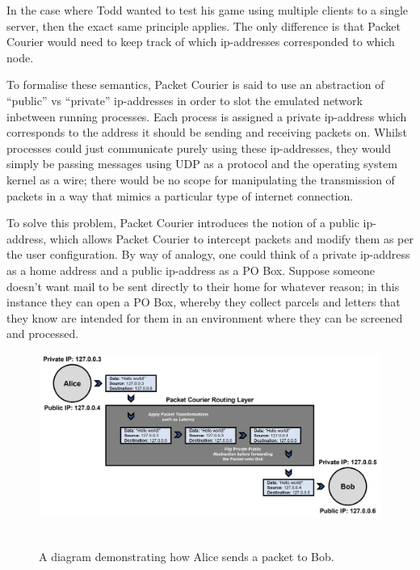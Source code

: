 In the case where Todd wanted to test his game using multiple clients to a single server, then the exact same
principle applies. The only difference is that Packet Courier would need to keep track of which ip-addresses
corresponded to which node.

To formalise these semantics, Packet Courier is said to use an abstraction of ``public'' vs ``private'' ip-addresses in
order to slot the emulated network inbetween running processes. Each process is assigned a private ip-address which
corresponds to the address it should be sending and receiving packets on. Whilst processes could just communicate purely
using these ip-addresses, they would simply be passing messages using UDP as a protocol and the operating system
kernel as a wire; there would be no scope for manipulating the transmission of packets in a way that mimics a
particular type of internet connection.

To solve this problem, Packet Courier introduces the notion of a public ip-address, which allows Packet Courier to
intercept packets and modify them as per the user configuration. By way of analogy, one could think of a private
ip-address as a home address and a public ip-address as a PO Box. Suppose someone doesn't want mail to be sent
directly to their home for whatever reason; in this instance they can open a PO Box, whereby they collect parcels and
letters that they know are intended for them in an environment where they can be screened and processed.

\begin{figure}[!h]
    \includegraphics[width=\textwidth]{images/chapter_3_design/emulation_semantics_diagram}
    \centering~\caption{A diagram demonstrating how Alice sends a packet to Bob.}
    \label{fig:chapter_3_design-emulation_semantics_diagram}
\end{figure}

